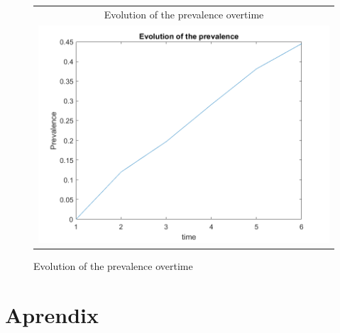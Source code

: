 \begin{figure}[H]
\caption{Evolution of the prevalence overtime}
\hspace{-2.0cm}
\begin{center}
\begin{tabular}{c}
\multicolumn{1}{c}{Evolution of the prevalence overtime} \\  
\includegraphics[angle=0,width=.5\textwidth]{figures/PREV.png}   

\end{tabular}
\end{center}
\label{fig:6}
\end{figure}



\section{Aprendix}
